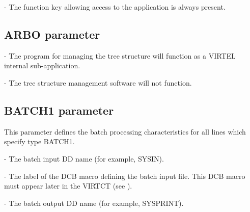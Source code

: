 \documentclass[letterpaper,10pt,english]{sphinxmanual}
\begin{document}
 - The function key allowing access to the application is always present.


\subsection{ARBO parameter}
\label{\detokenize{Installation_Guide:arbo-parameter}}\label{\detokenize{Installation_Guide:index-36}}
\begin{sphinxVerbatim}[commandchars=\\\{\}]
 
\end{sphinxVerbatim}

 - The program for managing the tree structure will function as a VIRTEL internal sub-application.

 - The tree structure management software will not function.


\subsection{BATCH1 parameter}
\label{\detokenize{Installation_Guide:batch1-parameter}}\label{\detokenize{Installation_Guide:index-37}}
\begin{sphinxVerbatim}[commandchars=\\\{\}]
   
\end{sphinxVerbatim}

This parameter defines the batch processing characteristics for all lines which specify type BATCH1.

 - The batch input DD name (for example, SYSIN).

 - The label of the DCB macro defining the batch input file. This DCB macro must appear later in the VIRTCT (see {\hyperref[\detokenize{Installation_Guide:vvrrig-bookmark72}]{}}).

 - The batch output DD name (for example, SYSPRINT).
\end{document}
